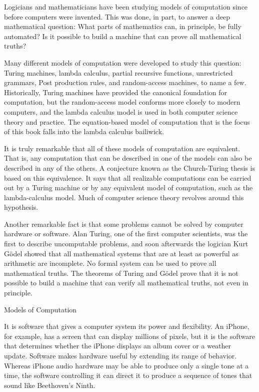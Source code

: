 \begin{aside}
Logicians and mathematicians have been studying
models of computation
since before computers were invented. This was done, in part, to
answer a deep mathematical question: What parts of mathematics can,
in principle, be fully automated?  Is it possible to
build a machine that can prove all mathematical truths?

Many different models of computation were developed to study this question:
Turing machines, lambda calculus,
partial recursive functions,
unrestricted grammars, Post production rules, and random-access machines,
to name a few.
Historically, Turing machines have provided the canonical foundation for computation,
but the random-access model conforms more closely to modern computers,
and the lambda calculus model is used in both computer science theory and practice.
The equation-based model of computation that is the focus of this book
falls into the lambda calculus bailiwick.

It is truly remarkable that all of these models of
computation are equivalent.  That is,
any computation that can be described in one of the models can
also be described in any of the others.
A conjecture known as the Church-Turing thesis
is based on this equivalence.
It says that all realizable computations can
be carried out by a Turing machine or by
any equivalent model of computation, such as
the lambda-calculus model.
Much of computer science theory
revolves around this hypothesis.

Another remarkable fact is that some problems cannot be solved
by computer hardware or software.
Alan Turing, one of the first computer scientists,
was the first to describe
uncomputable problems,
and soon afterwards the logician Kurt G\"odel
showed that all mathematical systems that are at least as
powerful as arithmetic
are incomplete. No formal system can be used
to prove all mathematical truths.
The theorems of Turing and G\"odel
prove that it is not possible to build a machine that can verify all mathematical
truths, not even in principle.

\caption{Models of Computation}
\label{aside-model-of-computation}
\end{aside}

It is software that gives a computer system its power and flexibility.
An iPhone, for example, has a screen that
can display millions of pixels,
but it is the software that determines whether the
iPhone displays an album cover or a weather update.
Software makes hardware useful by extending its range of behavior.
Whereas iPhone audio hardware may be able to produce
only a single tone at a time, the software controlling it
can direct it to produce a sequence of tones
that sound like Beethoven's Ninth.

